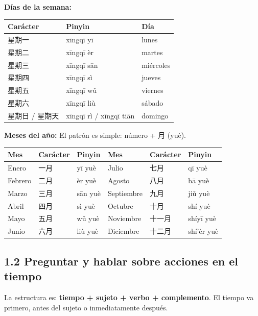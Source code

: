 \documentclass[12pt, a4paper]{article}
\begin{document}
\vspace{0.5em}
\noindent\textbf{Días de la semana:}

\begin{center}
\begin{tabular}{lll}
\toprule
\textbf{Carácter} & \textbf{Pinyin} & \textbf{Día} \\
\midrule
星期一 & xīngqī yī & lunes \\
星期二 & xīngqī èr & martes \\
星期三 & xīngqī sān & miércoles \\
星期四 & xīngqī sì & jueves \\
星期五 & xīngqī wǔ & viernes \\
星期六 & xīngqī liù & sábado \\
星期日 / 星期天 & xīngqī rì / xīngqī tiān & domingo \\
\bottomrule
\end{tabular}
\end{center}

\vspace{0.5em}
\noindent\textbf{Meses del año:} El patrón es simple: número + 月 (yuè).

\begin{center}
\begin{tabular}{lll|lll}
\toprule
\textbf{Mes} & \textbf{Carácter} & \textbf{Pinyin} & \textbf{Mes} & \textbf{Carácter} & \textbf{Pinyin} \\
\midrule
Enero    & 一月  & yī yuè    & Julio      & 七月  & qī yuè \\
Febrero  & 二月  & èr yuè    & Agosto     & 八月  & bā yuè \\
Marzo    & 三月  & sān yuè   & Septiembre & 九月  & jiǔ yuè \\
Abril    & 四月  & sì yuè    & Octubre    & 十月  & shí yuè \\
Mayo     & 五月  & wǔ yuè    & Noviembre  & 十一月 & shíyī yuè \\
Junio    & 六月  & liù yuè   & Diciembre  & 十二月 & shí'èr yuè \\
\bottomrule
\end{tabular}
\end{center}

\subsection{1.2 Preguntar y hablar sobre acciones en el tiempo}

La estructura es: \textbf{tiempo + sujeto + verbo + complemento}. El tiempo va primero, antes del sujeto o inmediatamente después.
\end{document}
